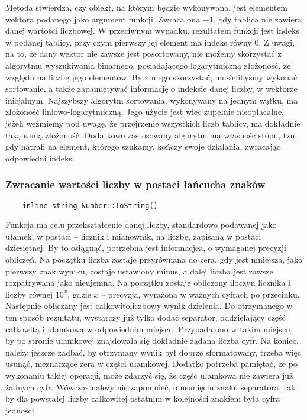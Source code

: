 \documentclass[oneside,a4paper]{book}
\begin{document}
	Metoda stwierdza, czy obiekt, na którym będzie wykonywana, jest elementem wektora podanego jako argument funkcji. Zwraca ona $-1$, gdy tablica nie zawiera danej wartości liczbowej. W przeciwnym wypadku, rezultatem funkcji jest indeks w podanej tablicy, przy czym pierwszy jej element ma indeks równy $0$. Z uwagi, na to, że dany wektor nie zawsze jest posortowany, nie możemy skorzystać z algorytmu wyszukiwania binarnego, posiadającego logarytmiczną złożoność, ze względu na liczbę jego elementów. By z niego skorzystać, musielibyśmy wykonać sortowanie, a także zapamiętywać informację o indeksie danej liczby, w wektorze inicjalnym. Najszybszy algorytm sortowania, wykonywany na jednym wątku, ma złożoność liniowo-logarytmiczną. Jego użycie jest wiec zupełnie nieopłacalne, jeżeli weźmiemy pod uwagę, że przejrzenie wszystkich liczb tablicy, ma dokładnie taką samą złożoność. Dodatkowo zastosowany algorytm ma własność stopu, tzn. gdy natrafi na element, którego szukamy, kończy swoje działania, zwracając odpowiedni indeks.
	
	\subsubsection{Zwracanie wartości liczby w postaci łańcucha znaków}
	\begin{lstlisting}
	inline string Number::ToString()
	\end{lstlisting}
	
	Funkcja ma celu przekształcenie danej liczby, standardowo podawanej jako ułamek, w postaci -- licznik i mianownik, na liczbę, zapisaną w postaci dziesiętnej. By to osiągnąć, potrzebna jest informacjea, o wymaganej precyzji obliczeń. Na początku liczba zostaje przyrównana do zera, gdy jest mniejsza, jako pierwszy znak wyniku, zostaje ustawiony minus, a dalej liczba jest zawsze rozpatrywana jako nieujemna. Na początku zostaje obliczony iloczyn licznika i liczby równej $10^x$, gdzie $x$ -- precyzja, wyrażona w ważnych cyfrach po przecinku. Następnie obliczany jest całkowitoliczbowy wynik dzielenia. Do otrzymanego w ten sposób rezultatu, wystarczy już tylko dodać separator, oddzielający część całkowitą i ułamkową w odpowiednim miejscu. Przypada ono w takim miejscu, by po stronie ułamkowej znajdowała się dokładnie żądana liczba cyfr. Na koniec, należy jeszcze zadbać, by otrzymany wynik był dobrze sformatowany, trzeba więc usunąć, nieznaczące zera w części ułamkowej. Dodatko potrzeba pamiętać, że po wykonaniu takiej operacji, może zdarzyć się, że część ułamkowa nie zawiera już żadnych cyfr. Wówczas należy nie zapomnieć, o usunięciu znaku separatora, tak by dla powstałej liczby całkowitej ostatnim w kolejności znakiem była cyfra jedności.
	
\end{document}
